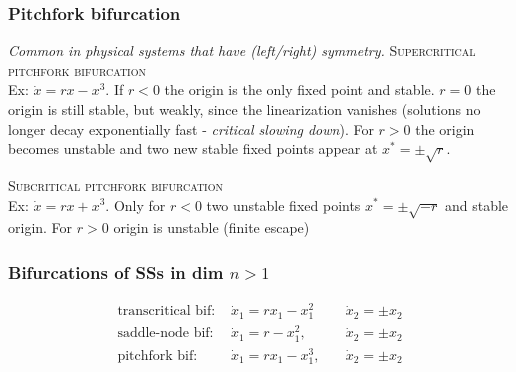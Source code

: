 \subsubsection{Pitchfork bifurcation}
\emph{Common in physical systems that have (left/right) symmetry.}
\textsc{Supercritical pitchfork bifurcation}\\
Ex: $\dot{x}=rx-x^3$. If $r<0$ the origin is the only fixed point and stable. $r=0$ the origin is still stable, but weakly, since the linearization vanishes (solutions no longer decay exponentially fast - \emph{critical slowing down}).  For $r>0$ the origin becomes unstable and two new stable fixed points appear at $x^*=\pm \sqrt{r}$.
\begin{center}
\end{center}
\vspace{0.2cm}

\textsc{Subcritical pitchfork bifurcation}\\
Ex: $\dot{x}=rx+x^3$. Only for $r<0$ two unstable fixed points $x^*=\pm \sqrt{-r}$ and stable origin. For $r>0$ origin is unstable (finite escape)
\begin{center}
\end{center}

\subsubsection{Bifurcations of SSs in dim $n>1$}
\begin{align*}
\text{transcritical bif: }& \dot{x}_1=rx_1-x_1^2 \quad &\dot{x}_2 = \pm x_2 \\
\text{saddle-node bif: }& \dot{x}_1 = r-x_1^2, \quad &\dot{x}_2 = \pm x_2\\
\text{pitchfork bif: }& \dot{x}_1=rx_1-x_1^3, \quad &\dot{x}_2 = \pm x_2
\end{align*}

